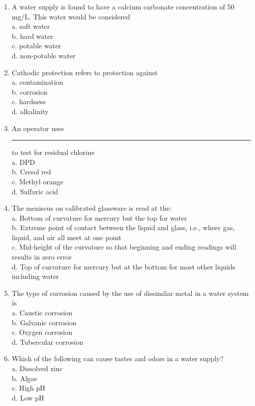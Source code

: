 \documentclass{article}
\begin{document}
\begin{enumerate}[1.]
\item A water supply is found to have a calcium carbonate concentration of 50 mg/L. This water would be considered\\
a.	soft water\\
b.	hard water\\
c.	potable water\\
d.	non-potable water\\

\item Cathodic protection refers to protection against\\
a.	contamination\\
b.	corrosion\\
c.	hardness\\
d.  alkalinity

\item An operator uses \rule{2cm}{0.3pt} to test for residual chlorine\\
a. DPD\\
b. Cresol red\\
c. Methyl orange\\
d. Sulfuric acid\\

\item The meniscus on calibrated glassware is read at the:\\
a. Bottom of curvature for mercury but the top for water\\
b. Extreme point of contact between the liquid and glass, i.e., where gas, liquid, and air all meet at one point\\
c. Mid-height of the curvature so that beginning and ending readings will results in zero error\\
d. Top of curvature for mercury but at the bottom for most other liquids including water

\item The type of corrosion caused by the use of dissimilar metal in a water system is\\
a. Caustic corrosion\\
b. Galvanic corrosion\\
c. Oxygen corrosion\\
d. Tubercular corrosion\\

\item Which of the following can cause tastes and odors in a water supply?\\
a. Dissolved zinc\\
b. Algae\\
c. High pH\\
d. Low pH\\



\end{enumerate}
\end{document}
